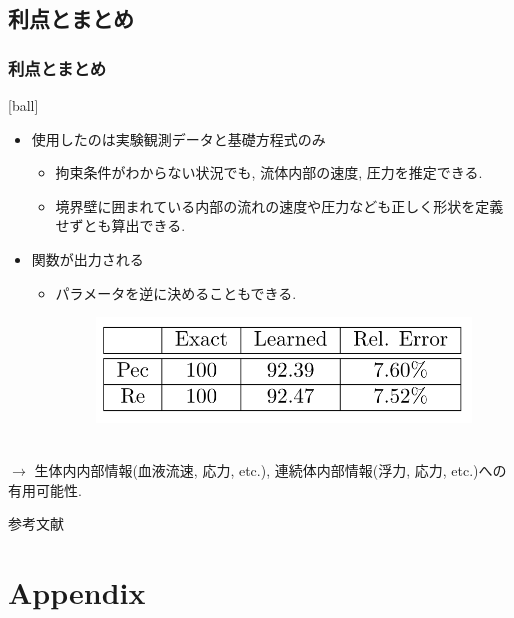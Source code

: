 \documentclass[xcolor=dvipsnames,hyperref={breaklinks=true},mathserif,professionalfont,dvipdfmx,12pt]{beamer}
\begin{document}
\subsection{利点とまとめ}
\begin{frame}
  \frametitle{利点とまとめ}
  [ball]
  \begin{itemize}
    \item 使用したのは実験観測データと基礎方程式のみ
    \begin{itemize}
      \item 拘束条件がわからない状況でも, 流体内部の速度, 圧力を推定できる.
      \item 境界壁に囲まれている内部の流れの速度や圧力なども正しく形状を定義せずとも算出できる.
    \end{itemize}
    \item 関数が出力される
    \begin{itemize}
      \item パラメータを逆に決めることもできる.
      \begin{figure}[H]
        \centering
          \includegraphics[width=0.5\linewidth]{figure/fig7.png}
      \end{figure}
    \end{itemize}
  \end{itemize}
  \\
  \footnotesize$\rightarrow$ 生体内内部情報(血液流速, 応力, etc.), 連続体内部情報(浮力, 応力, etc.)への有用可能性.\normalsize
\end{frame}



\begin{frame}[allowframebreaks]{参考文献}
  \printbibliography
\end{frame}

\section{Appendix}
\end{document}
